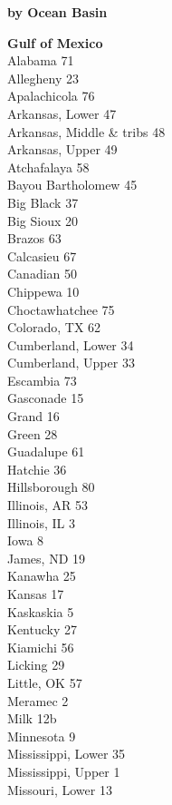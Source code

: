 \documentclass[11pt]{article}
\begin{document}
\newpage
\thispagestyle{empty}
\begin{center}
	\textbf{by Ocean Basin}
\end{center}
\begin{multicols}{3}
\textbf{Gulf of Mexico}\\
Alabama 71\\
Allegheny 23\\
Apalachicola 76\\
Arkansas, Lower 47\\
Arkansas, Middle \& tribs 48\\
Arkansas, Upper 49\\
Atchafalaya 58\\
Bayou Bartholomew 45\\
Big Black 37\\
Big Sioux 20\\
Brazos 63\\
Calcasieu 67\\
Canadian 50\\
Chippewa 10\\
Choctawhatchee 75\\
Colorado, TX 62\\
Cumberland, Lower 34\\
Cumberland, Upper 33\\
Escambia 73\\
Gasconade 15\\
Grand 16\\
Green 28\\
Guadalupe 61\\
Hatchie 36\\
Hillsborough 80\\
Illinois, AR 53\\
Illinois, IL 3\\
Iowa 8\\
James, ND 19\\
Kanawha 25\\
Kansas 17\\
Kaskaskia 5\\
Kentucky 27\\
Kiamichi 56\\
Licking 29\\
Little, OK 57\\
Meramec 2\\
Milk 12b\\
Minnesota 9\\
Mississippi, Lower 35\\
Mississippi, Upper 1\\
Missouri, Lower 13\\

\end{multicols}
\end{document}
